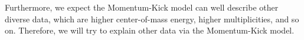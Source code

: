 \documentclass[jkps,fleqn,showpacs,showkeys]{revtex4}
\begin{document}


Furthermore, we expect the Momentum-Kick model can well describe other diverse data, which are higher center-of-mass energy, higher multiplicities, and so on.
Therefore, we will try to explain other data via the Momentum-Kick model.



\end{document}
